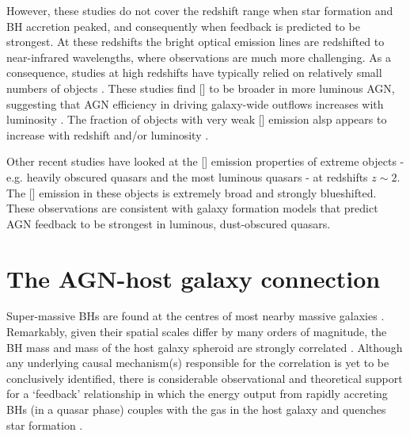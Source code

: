 However, these studies do not cover the redshift range when star formation and BH accretion peaked, and consequently when feedback is predicted to be strongest. 
At these redshifts the bright optical emission lines are redshifted to near-infrared wavelengths, where observations are much more challenging. 
As a consequence, studies at high redshifts have typically relied on relatively small numbers of objects \citep[e.g.][]{netzer04,sulentic04,shen16a}.
These studies find [] to be broader in more luminous AGN, suggesting that AGN efficiency in driving galaxy-wide outflows increases with luminosity \citep[e.g.][]{netzer04,nesvadba08,kim13,brusa15,carniani15,perna15,bischetti16}. 
The fraction of objects with very weak [] emission alsp appears to increase with redshift and/or luminosity \citep[e.g.][]{netzer04}. 

Other recent studies have looked at the [] emission properties of extreme objects - e.g. heavily obscured quasars \citep{zakamska16} and the most luminous quasars \citep{bischetti16} - at redshifts $z\sim2$. 
The [] emission in these objects is extremely broad and strongly blueshifted. 
These observations are consistent with galaxy formation models that predict AGN feedback to be strongest in luminous, dust-obscured quasars.














\section{The AGN-host galaxy connection}

Super-massive BHs are found at the centres of most nearby massive galaxies \citep[e.g.][]{kormendy95,ferrarese05,kormendy13}.
Remarkably, given their spatial scales differ by many orders of magnitude, the BH mass and mass of the host galaxy spheroid are strongly correlated \citep{ferrarese00,gebhardt00,graham01,tremaine02,marconi03,aller07,gultekin09}.  
Although any underlying causal mechanism(s) responsible for the correlation is yet to be conclusively identified, there is considerable observational and theoretical support for a `feedback' relationship in which the energy output from rapidly accreting BHs (in a quasar phase) couples with the gas in the host galaxy and quenches star formation \citep[e.g.][]{silk98,king03,dimatteo05,king15}. 

